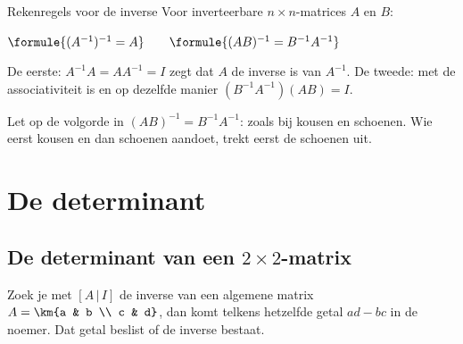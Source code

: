 \begin{theorie}
\begin{stelling}{Rekenregels voor de inverse}
Voor inverteerbare $n \times n$-matrices $A$ en $B$:

\vspace{1mm}
\qquad $\formule{(A^{-1})^{-1} = A} \qquad \formule{(AB)^{-1} = B^{-1}A^{-1}}$
\end{stelling}

\begin{bewijs}
De eerste: $A^{-1}A = AA^{-1} = I$ zegt dat $A$ de inverse is van $A^{-1}$. De tweede: met de associativiteit is
en op dezelfde manier $(B^{-1}A^{-1})(AB) = I$.
\end{bewijs}
\end{theorie}

Let op de volgorde in $(AB)^{-1} = B^{-1}A^{-1}$: zoals bij kousen en schoenen. Wie eerst kousen en dan schoenen aandoet, trekt eerst de schoenen uit.


\begin{oefeningen}

\end{oefeningen}

\section{De determinant}

\subsection{De determinant van een \texorpdfstring{$2 \times 2$}{2x2}-matrix}

Zoek je met $[A \,|\, I]$ de inverse van een algemene matrix $A = \km{a & b \\ c & d}$, dan komt telkens hetzelfde getal $ad - bc$ in de noemer. Dat getal beslist of de inverse bestaat.


